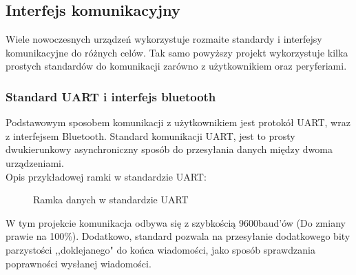     \subsection{Interfejs komunikacyjny}
        \tab Wiele nowoczesnych urządzeń wykorzystuje rozmaite standardy i interfejsy komunikacyjne do różnych celów.
        Tak samo powyższy projekt wykorzystuje kilka prostych standardów do komunikacji zarówno z użytkownikiem oraz peryferiami.

        \subsubsection{Standard UART i interfejs bluetooth}
            \tab Podstawowym sposobem komunikacji z użytkownikiem jest protokół UART, wraz z interfejsem Bluetooth.
            Standard komunikacji UART, jest to prosty dwukierunkowy asynchroniczny sposób do przesyłania danych między dwoma urządzeniami.\\
            Opis przykładowej ramki w standardzie UART:
            
            \begin{figure}[!h]
                \centering
                \caption{Ramka danych w standardzie UART}
            \end{figure}
% 
            \noindent
            W tym projekcie komunikacja odbywa się z szybkością 9600baud'ów (Do zmiany prawie na 100\%).
            Dodatkowo, standard pozwala na przesyłanie dodatkowego bity parzystości ,,doklejanego" do końca wiadomości, jako sposób sprawdzania poprawności wysłanej wiadomości.

